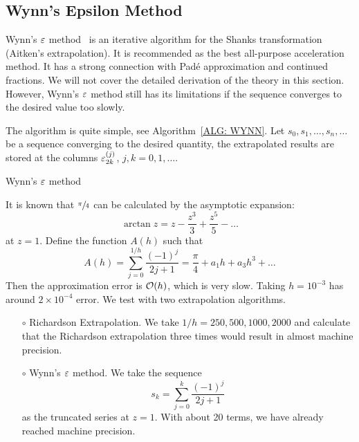 \subsection{Wynn's Epsilon Method}
\label{SSec: 3-Wynn-Eps-Met}
Wynn's $\varepsilon$ method~\cite{wynn1956device,wynn1966convergence} is an iterative algorithm for the Shanks transformation (Aitken's extrapolation). It is recommended as the best all-purpose acceleration method. It has a strong connection with Pad\'e approximation and continued fractions. We will not cover the detailed derivation of the theory in this section. However, Wynn's $\varepsilon$ method still has its limitations if the sequence converges to the desired value too slowly. 

The algorithm is quite simple, see Algorithm~\ref{ALG: WYNN}. Let $s_0, s_1, \dots, s_n,\dots$ be a sequence converging to the desired quantity,  the extrapolated results are stored at the columns $\varepsilon_{2k}^{(j)}$, $j, k=0,1, \dots$.
\begin{algorithm}[!htb]
    \SetAlgoLined
    \caption{Wynn's $\varepsilon$ method}
    \label{ALG: WYNN}
\end{algorithm}

\begin{example}
    It is known that $\sfrac{\pi}{4}$ can be calculated by the asymptotic expansion:
    \begin{equation}
        \arctan z = z - \frac{z^3}{3} + \frac{z^5}{5} - \dots 
    \end{equation}
    at $z = 1$. Define the function $A(h)$ such that 
    \begin{equation}
        A(h)= \sum_{j=0}^{1/h} \frac{(-1)^j}{2 j + 1} = \frac{\pi}{4} + a_1 h + a_3 h^3 + \dots
    \end{equation}
    Then the approximation error is $\mathcal O(h)$, which is very slow. Taking $h=10^{-3}$ has around $2\times 10^{-4}$ error.  We test with two extrapolation algorithms.
    \begin{enumerate}
        \item [$\circ$] Richardson Extrapolation. We take $1/h = 250, 500, 1000, 2000$ and calculate that the Richardson extrapolation three times would result in almost machine precision.
        \item [$\circ$] Wynn's $\varepsilon$ method. We take the sequence 
        $$s_k = \sum_{j=0}^k \frac{(-1)^j}{2 j + 1}$$
        as the truncated series at $z = 1$. With about 20 terms, we have already reached machine precision.
    \end{enumerate}
\end{example}

